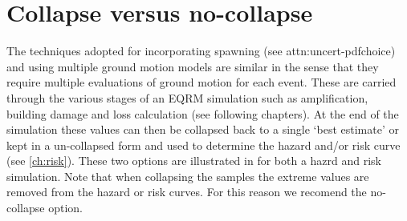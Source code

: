 \section{Collapse versus no-collapse}

The techniques adopted for incorporating spawning (see \sref
{attn:uncert-pdfchoice}) and using multiple ground motion models are
similar in the sense that they require multiple evaluations of
ground motion for each event. These are carried through the various
stages of an EQRM simulation such as amplification, building damage
and loss calculation (see following chapters). At the end of the
simulation these values can then be collapsed back to a single `best
estimate' or kept in a un-collapsed form and used to determine the
hazard and/or risk curve (see \cref{ch:risk}). These two options are
illustrated in  for both a hazrd and
risk simulation. Note that when collapsing the samples the extreme
values are removed from the hazard or risk curves. For this reason
we recomend the no-collapse option.


